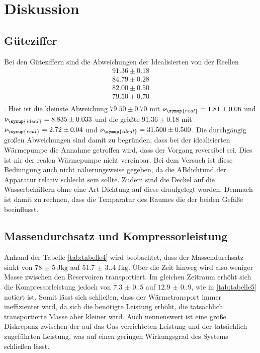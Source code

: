 \section{Diskussion}
\label{sec:Diskussion}

\subsection{Güteziffer}
Bei den Güteziffern sind die Abweichungen der Idealisierten von der Reellen 
\begin{gather*}
    91.36    \pm   0.18\\
    84.79    \pm   0.28\\
    82.00    \pm   0.50\\
    79.50    \pm   0.70\\
\end{gather*}
.
Hier ist die kleinste Abweichung $79.50    \pm   0.70$ mit $\nu_{\symup{real}}=1.81\pm   0.06 $   und     $\nu_{\symup{ideal}}=8.835    \pm   0.033$
und die größte $91.36    \pm   0.18$ mit $\nu_{\symup{real}}=2.72   \pm   0.04  $ und $   \nu_{\symup{ideal}}=31.500    \pm  0.500 $. 
Die durchgängig großen Abweichungen sind damit zu begründen, dass bei der idealisierten Wärmepumpe die Annahme getroffen wird, dass der Vorgang reversibel sei.
Dies ist nir der realen Wärmepumpe nicht vereinbar.
Bei dem Versuch ist diese Bediungung auch nicht näherungsweise gegeben, da die ABdichtund der Apparatur relativ schlecht sein sollte.
Zudem sind die Deckel auf die Wasserbehältern ohne eine Art Dichtung auf diese draufgelegt worden. 
Demnach ist damit zu rechnen, dass die Temparatur des Raumes die der beiden Gefäße beeinflusst.

\subsection{Massendurchsatz und Kompressorleistung}

Anhand der Tabelle \ref{tab:tabelle4} wird beobachtet, dass der Massendurchsatz sinkt von $\qty{78(5)}{\joule\kilo\gram}$ auf
$\qty{51.7(3.4)}{\joule\kilo\gram}$. Über die Zeit hinweg wird also weniger Masse zwischen den Reservoiren transportiert.
Im gleichen Zeitraum erhöht sich die Kompressorleistung jedoch von $\qty{7.3(0.5)}$ auf $\qty{12.9(0.9)}$, wie in 
\ref{tab:tabelle5} notiert ist. Somit lässt sich schließen, dass der Wärmetransport immer ineffizienter wird, da sich die
benötigte Leistung erhöht, die tatsächlich transportierte Masse aber kleiner wird. Auch nennenswert ist eine große Diskrepanz
zwischen der auf das Gas verrichteten Leistung und der tatsächlich zugeführten Leistung, was auf einen geringen 
Wirkungsgrad des Systems schließen lässt.


